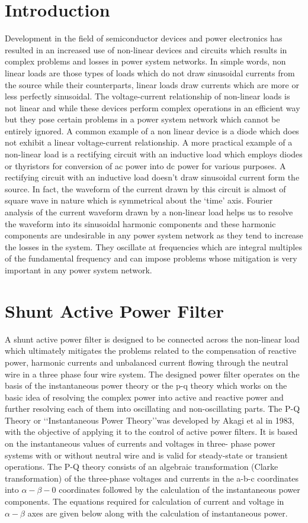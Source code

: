 \documentclass[journal,twoside]{IEEEtran}
\begin{document}
	\section{Introduction}
Development in the field of semiconductor devices and power electronics has resulted in an increased use of non-linear devices and circuits which results in complex problems and losses in power system networks. In simple words, non
linear loads are those types of loads which do not draw sinusoidal currents from the source while their counterparts,
linear loads draw currents which are more or less perfectly sinusoidal. The voltage-current relationship of non-linear loads
is not linear and while these devices perform complex operations in an efficient way but they pose certain problems
in a power system network which cannot be entirely ignored. A common example of a non linear device is a diode
which does not exhibit a linear voltage-current relationship. A more practical example of a non-linear load is a rectifying
circuit with an inductive load which employs diodes or thyristors for conversion of ac power into dc power for various
purposes. A rectifying circuit with an inductive load doesn’t draw sinusoidal current form the source. In fact, the waveform
of the current drawn by this circuit is almost of square wave in nature which is symmetrical about the ‘time’ axis.
Fourier analysis of the current waveform drawn by a non-linear load helps us to resolve the waveform into its sinusoidal
harmonic components and these harmonic components are undesirable in any power system network as they tend to
increase the losses in the system. They oscillate at frequencies which are integral multiples of the fundamental frequency and
can impose problems whose mitigation is very important in any power system network.
	

\section{Shunt Active Power Filter}
A shunt active power filter is designed to be connected across the non-linear load which ultimately mitigates the
problems related to the compensation of reactive power, harmonic currents and unbalanced current flowing through the
neutral wire in a three phase four wire system. The designed power filter operates on the basis of the
instantaneous power theory or the p-q theory which works on the basic idea of resolving the complex power into active and
reactive power and further resolving each of them into oscillating and non-oscillating parts.
The P-Q Theory or \lq\lq Instantaneous Power Theory\rq\rq was developed by Akagi et al in 1983, with the objective of
applying it to the control of active power filters. It is based on the instantaneous values of currents and voltages in three-
phase power systems with or without neutral wire and is valid for steady-state or transient operations. The P-Q theory consists
of an algebraic transformation (Clarke transformation) of the three-phase voltages and currents in the a-b-c coordinates into
$\alpha - \beta - 0$ coordinates followed by the calculation of the instantaneous power components.
The equations required for calculation of current and
voltage in $\alpha-\beta$ axes are given below along with the calculation
of instantaneous power. 
\end{document}
